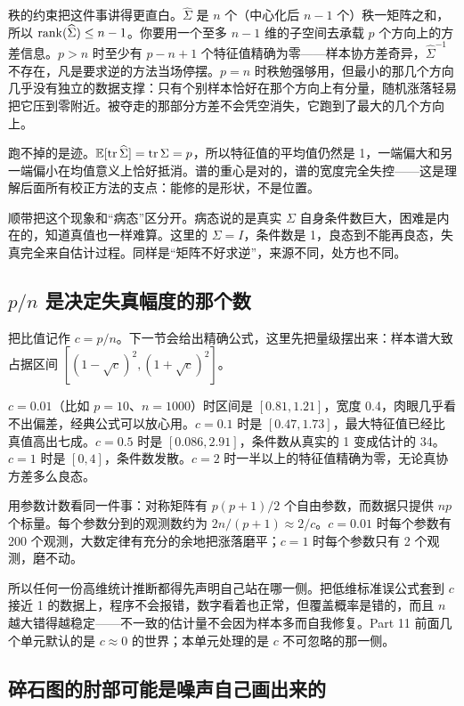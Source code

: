 秩的约束把这件事讲得更直白。\(\widehat\Sigma\) 是 \(n\) 个（中心化后 \(n-1\) 个）秩一矩阵之和，所以 \(\operatorname{rank}(\widehat\Sigma)\le n-1\)。你要用一个至多 \(n-1\) 维的子空间去承载 \(p\) 个方向上的方差信息。\(p>n\) 时至少有 \(p-n+1\) 个特征值精确为零——样本协方差奇异，\(\widehat\Sigma^{-1}\) 不存在，凡是要求逆的方法当场停摆。\(p=n\) 时秩勉强够用，但最小的那几个方向几乎没有独立的数据支撑：只有个别样本恰好在那个方向上有分量，随机涨落轻易把它压到零附近。被夺走的那部分方差不会凭空消失，它跑到了最大的几个方向上。

跑不掉的是迹。\(\mathbb{E}[\operatorname{tr}\widehat\Sigma]=\operatorname{tr}\Sigma=p\)，所以特征值的平均值仍然是 1，一端偏大和另一端偏小在均值意义上恰好抵消。谱的重心是对的，谱的宽度完全失控——这是理解后面所有校正方法的支点：能修的是形状，不是位置。

顺带把这个现象和``病态''区分开。病态说的是真实 \(\Sigma\) 自身条件数巨大，困难是内在的，知道真值也一样难算。这里的 \(\Sigma=I\)，条件数是 1，良态到不能再良态，失真完全来自估计过程。同样是``矩阵不好求逆''，来源不同，处方也不同。

\subsection{\(p/n\) 是决定失真幅度的那个数}

把比值记作 \(c=p/n\)。下一节会给出精确公式，这里先把量级摆出来：样本谱大致占据区间 \([(1-\sqrt c)^2,(1+\sqrt c)^2]\)。

\(c=0.01\)（比如 \(p=10\)、\(n=1000\)）时区间是 \([0.81,1.21]\)，宽度 0.4，肉眼几乎看不出偏差，经典公式可以放心用。\(c=0.1\) 时是 \([0.47,1.73]\)，最大特征值已经比真值高出七成。\(c=0.5\) 时是 \([0.086,2.91]\)，条件数从真实的 1 变成估计的 34。\(c=1\) 时是 \([0,4]\)，条件数发散。\(c=2\) 时一半以上的特征值精确为零，无论真协方差多么良态。

用参数计数看同一件事：对称矩阵有 \(p(p+1)/2\) 个自由参数，而数据只提供 \(np\) 个标量。每个参数分到的观测数约为 \(2n/(p+1)\approx 2/c\)。\(c=0.01\) 时每个参数有 200 个观测，大数定律有充分的余地把涨落磨平；\(c=1\) 时每个参数只有 2 个观测，磨不动。

所以任何一份高维统计推断都得先声明自己站在哪一侧。把低维标准误公式套到 \(c\) 接近 1 的数据上，程序不会报错，数字看着也正常，但覆盖概率是错的，而且 \(n\) 越大错得越稳定——不一致的估计量不会因为样本多而自我修复。Part 11 前面几个单元默认的是 \(c\approx0\) 的世界；本单元处理的是 \(c\) 不可忽略的那一侧。

\subsection{碎石图的肘部可能是噪声自己画出来的}

